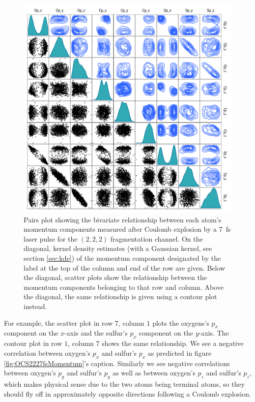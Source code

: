 \begin{figure}
  \centering
  \includegraphics[width=\textwidth]{Plots/OCS2227fsMomentumPairsPlot}
  \caption[Pairs plot showing the bivariate relationship between each atom's momentum components measured after Coulomb explosion by a \SI{7}{\fs} laser pulse for the $(2,2,2)$ fragmentation channel.]
  {Pairs plot showing the bivariate relationship between each atom's momentum components measured after Coulomb explosion by a \SI{7}{\fs} laser pulse for the $(2,2,2)$ fragmentation channel. On the diagonal, kernel density estimates (with a Gaussian kernel, see section \ref{sec:kde}) of the momentum component designated by the label at the top of the column and end of the row are given. Below the diagonal, scatter plots show the relationship between the momentum components belonging to that row and column. Above the diagonal, the same relationship is given using a contour plot instead.}
  \label{fig:OCS2227fsMomentumPairPlots}
\end{figure}

For example, the scatter plot in row $7$, column $1$ plots the oxygens's $p_x$ component on the $x$-axis and the sulfur's $p_x$ component on the $y$-axis. The contour plot in row $1$, column $7$ shows the same relationship. We see a negative correlation between oxygen's $p_x$ and sulfur's $p_x$ as predicted in figure \ref{fig:OCS2227fsMomentum}'s caption. Similarly we see negative correlations between oxygen's $p_y$ and sulfur's $p_y$ as well as between oxygen's $p_z$ and sulfur's $p_z$, which makes physical sense due to the two atoms being terminal atoms, so they should fly off in approximately opposite directions following a Coulomb explosion.

